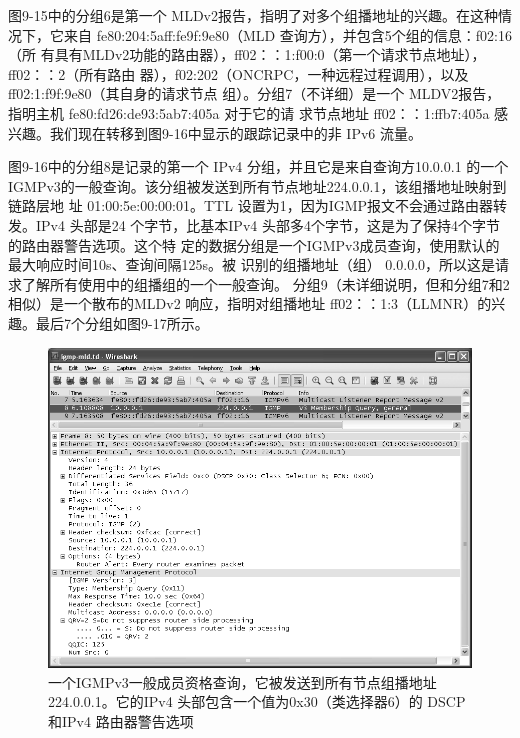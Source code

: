 图9-15中的分组6是第一个 MLDv2报告，指明了对多个组播地址的兴趣。在这种情
况下，它来自 fe80:204:5aff:fe9f:9e80（MLD 查询方），并包含5个组的信息：f02:16（所
有具有MLDv2功能的路由器），ff02：：1:f00:0（第一个请求节点地址），ff02：：2（所有路由
器），f02:202（ONCRPC，一种远程过程调用），以及 ff02:1:f9f:9e80（其自身的请求节点
组）。分组7（不详细）是一个 MLDV2报告，指明主机 fe80:fd26:de93:5ab7:405a 对于它的请
求节点地址 ff02：：1:ffb7:405a 感兴趣。我们现在转移到图9-16中显示的跟踪记录中的非 IPv6
流量。

图9-16中的分组8是记录的第一个 IPv4 分组，并且它是来自查询方10.0.0.1 的一个
IGMPv3的一般查询。该分组被发送到所有节点地址224.0.0.1，该组播地址映射到链路层地
址 01:00:5e:00:00:01。TTL 设置为1，因为IGMP报文不会通过路由器转发。IPv4 头部是24
个字节，比基本IPv4 头部多4个字节，这是为了保持4个字节的路由器警告选项。这个特
定的数据分组是一个IGMPv3成员查询，使用默认的最大响应时间10s、查询间隔125s。被
识别的组播地址（组） 0.0.0.0，所以这是请求了解所有使用中的组播组的一个一般查询。
分组9（未详细说明，但和分组7和2相似）是一个散布的MLDv2 响应，指明对组播地址
ff02：：1:3（LLMNR）的兴趣。最后7个分组如图9-17所示。
\begin{figure}[ht]
    \centering
	\includegraphics[width=1.0\textwidth]{imgs/9/9-16.png}
	\caption{一个IGMPv3一般成员资格查询，它被发送到所有节点组播地址 224.0.0.1。它的IPv4 头部包含一个值为0x30（类选择器6）的 DSCP 和IPv4 路由器警告选项}
\end{figure}

